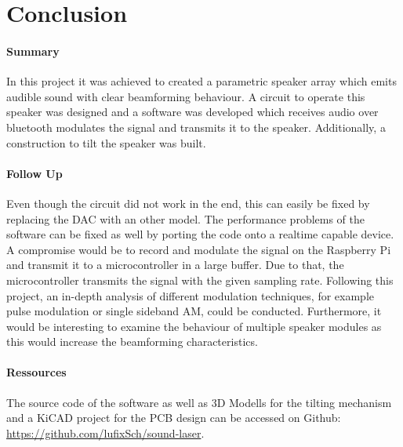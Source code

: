 \chapter{Conclusion}


\subsubsection*{Summary}

In this project it was achieved to created a parametric speaker array which emits audible sound with clear beamforming behaviour. A circuit to operate this speaker was designed and a software was developed which receives audio over bluetooth modulates the signal and transmits it to the speaker. Additionally, a construction to tilt the speaker was built.
%
\subsubsection*{Follow Up}
%
Even though the circuit did not work in the end, this can easily be fixed by replacing the DAC with an other model. The performance problems of the software can be fixed as well by porting the code onto a realtime capable device. A compromise would be to record and modulate the signal on the Raspberry Pi and transmit it to a microcontroller in a large buffer. Due to that, the microcontroller transmits the signal with the given sampling rate.\p
%
Following this project, an in-depth analysis of different modulation techniques, for example pulse modulation or single sideband AM, could be conducted. Furthermore, it would be interesting to examine the behaviour of multiple speaker modules as this would increase the beamforming characteristics.
%
\subsubsection*{Ressources}
%
The source code of the software as well as 3D Modells for the tilting mechanism and a KiCAD project for the PCB design can be accessed on Github: \href{https://github.com/lufixSch/sound-laser}{https://github.com/lufixSch/sound-laser}.